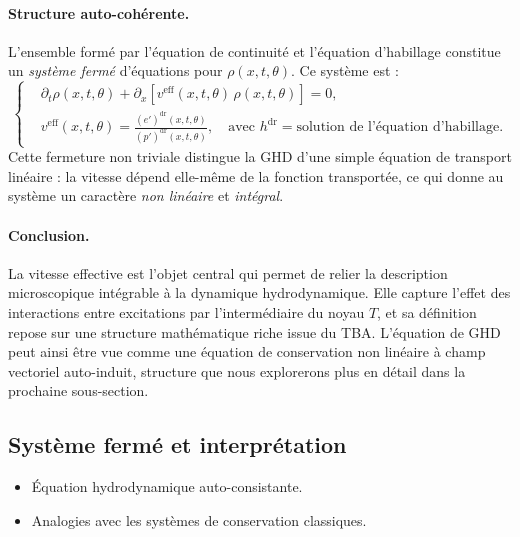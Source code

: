 \paragraph{Structure auto-cohérente.}
L’ensemble formé par l’équation de continuité et l’équation d’habillage constitue un \emph{système fermé} d’équations pour $\rho(x,t,\theta)$. Ce système est :
\[
\left\{
\begin{aligned}
&\partial_t \rho(x,t,\theta) + \partial_x \left[ v^{\mathrm{eff}}(x,t,\theta)\, \rho(x,t,\theta) \right] = 0, \\
&v^{\mathrm{eff}}(x,t,\theta) = \frac{(e')^{\mathrm{dr}}(x,t,\theta)}{(p')^{\mathrm{dr}}(x,t,\theta)}, \quad \text{avec } h^{\mathrm{dr}} = \text{solution de l’équation d’habillage.}
\end{aligned}
\right.
\]
Cette fermeture non triviale distingue la GHD d’une simple équation de transport linéaire : la vitesse dépend elle-même de la fonction transportée, ce qui donne au système un caractère \emph{non linéaire} et \emph{intégral}.

\paragraph{Conclusion.}
La vitesse effective est l’objet central qui permet de relier la description microscopique intégrable à la dynamique hydrodynamique. Elle capture l’effet des interactions entre excitations par l’intermédiaire du noyau $T$, et sa définition repose sur une structure mathématique riche issue du TBA. L’équation de GHD peut ainsi être vue comme une équation de conservation non linéaire à champ vectoriel auto-induit, structure que nous explorerons plus en détail dans la prochaine sous-section.


\subsection{Système fermé et interprétation}
{\color{blue}
\begin{itemize}
    \item Équation hydrodynamique auto-consistante.
    \item Analogies avec les systèmes de conservation classiques.
\end{itemize}
}


